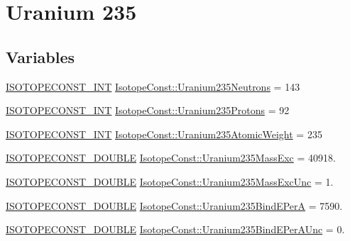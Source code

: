 \hypertarget{group___isotope_const-_uranium-_u235}{}\section{Uranium 235}
\label{group___isotope_const-_uranium-_u235}
\subsection*{Variables}
\begin{DoxyCompactItemize}
\item 
\mbox{\hyperlink{group___isotope_const-_macros_ga5f18360b3e99483a35c32d789e62621c}{I\+S\+O\+T\+O\+P\+E\+C\+O\+N\+S\+T\+\_\+\+I\+NT}} \mbox{\hyperlink{group___isotope_const-_uranium-_u235_gaacb7a4cf1020f48dc72672fed4969a70}{Isotope\+Const\+::\+Uranium235\+Neutrons}} = 143
\item 
\mbox{\hyperlink{group___isotope_const-_macros_ga5f18360b3e99483a35c32d789e62621c}{I\+S\+O\+T\+O\+P\+E\+C\+O\+N\+S\+T\+\_\+\+I\+NT}} \mbox{\hyperlink{group___isotope_const-_uranium-_u235_ga83e44b6128bc45b8579bec557de6d7be}{Isotope\+Const\+::\+Uranium235\+Protons}} = 92
\item 
\mbox{\hyperlink{group___isotope_const-_macros_ga5f18360b3e99483a35c32d789e62621c}{I\+S\+O\+T\+O\+P\+E\+C\+O\+N\+S\+T\+\_\+\+I\+NT}} \mbox{\hyperlink{group___isotope_const-_uranium-_u235_ga6372e0f0607cfd500265f2aac2bb535c}{Isotope\+Const\+::\+Uranium235\+Atomic\+Weight}} = 235
\item 
\mbox{\hyperlink{group___isotope_const-_macros_ga8f45a7272ce02c0b4c65c44636ed719a}{I\+S\+O\+T\+O\+P\+E\+C\+O\+N\+S\+T\+\_\+\+D\+O\+U\+B\+LE}} \mbox{\hyperlink{group___isotope_const-_uranium-_u235_gaf6a3ffa9fd735867636bf347570a5d43}{Isotope\+Const\+::\+Uranium235\+Mass\+Exc}} = 40918.
\item 
\mbox{\hyperlink{group___isotope_const-_macros_ga8f45a7272ce02c0b4c65c44636ed719a}{I\+S\+O\+T\+O\+P\+E\+C\+O\+N\+S\+T\+\_\+\+D\+O\+U\+B\+LE}} \mbox{\hyperlink{group___isotope_const-_uranium-_u235_gac6f3de66cfc208de269d7e9308c67b9e}{Isotope\+Const\+::\+Uranium235\+Mass\+Exc\+Unc}} = 1.
\item 
\mbox{\hyperlink{group___isotope_const-_macros_ga8f45a7272ce02c0b4c65c44636ed719a}{I\+S\+O\+T\+O\+P\+E\+C\+O\+N\+S\+T\+\_\+\+D\+O\+U\+B\+LE}} \mbox{\hyperlink{group___isotope_const-_uranium-_u235_ga2f1bc63479f2f6b2a2dbbc5ebe8967ed}{Isotope\+Const\+::\+Uranium235\+Bind\+E\+PerA}} = 7590.
\item 
\mbox{\hyperlink{group___isotope_const-_macros_ga8f45a7272ce02c0b4c65c44636ed719a}{I\+S\+O\+T\+O\+P\+E\+C\+O\+N\+S\+T\+\_\+\+D\+O\+U\+B\+LE}} \mbox{\hyperlink{group___isotope_const-_uranium-_u235_ga5bc7905b197fdab8a391de1cd2822480}{Isotope\+Const\+::\+Uranium235\+Bind\+E\+Per\+A\+Unc}} = 0.

\end{DoxyCompactItemize}
